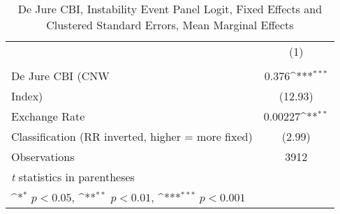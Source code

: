 \begin{table}[htbp]\centering
\def\sym#1{\ifmmode^{#1}\else\(^{#1}\)\fi}
\caption{De Jure CBI, Instability Event Panel Logit, Fixed Effects and Clustered Standard Errors, Mean Marginal Effects \label{margsJustBinInstabEventDJ}}
\begin{tabular}{l*{1}{c}}
\toprule
                &\multicolumn{1}{c}{(1)}\\
                &\multicolumn{1}{c}{}\\
\midrule
De Jure CBI (CNW&    0.376\sym{***}\\
Index)          &  (12.93)         \\
\addlinespace
Exchange Rate   &  0.00227\sym{**} \\
Classification (RR inverted, higher = more fixed)&   (2.99)         \\
\midrule
Observations    &     3912         \\
\bottomrule
\multicolumn{2}{l}{\footnotesize \textit{t} statistics in parentheses}\\
\multicolumn{2}{l}{\footnotesize \sym{*} \(p<0.05\), \sym{**} \(p<0.01\), \sym{***} \(p<0.001\)}\\
\end{tabular}
\end{table}

